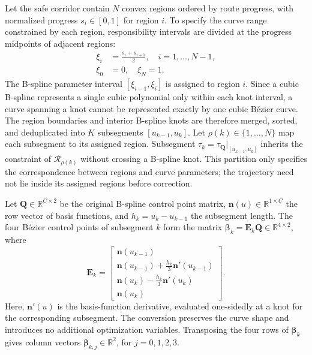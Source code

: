 \documentclass[journal]{IEEEtran}
\begin{document}
Let the safe corridor contain $N$ convex regions ordered by route progress,
with normalized progress $s_i\in[0,1]$ for region $i$. To specify the curve
range constrained by each region, responsibility intervals are divided at
the progress midpoints of adjacent regions:
\begin{equation}
\begin{aligned}
\xi_i&=\frac{s_i+s_{i+1}}{2},\quad i=1,\ldots,N-1,\\
\xi_0&=0,\quad \xi_N=1.
\end{aligned}
\end{equation}
The B-spline parameter interval $[\xi_{i-1},\xi_i]$ is assigned to region $i$.
Since a cubic B-spline represents a single cubic polynomial only within each
knot interval, a curve spanning a knot cannot be represented exactly by one
cubic B\'ezier curve. The region boundaries and interior B-spline knots are
therefore merged, sorted, and deduplicated into $K$ subsegments
$[u_{k-1},u_k]$. Let $\rho(k)\in\{1,\ldots,N\}$ map each subsegment to its
assigned region. Subsegment $\tau_k=\tau_{\mathbf Q}|_{[u_{k-1},u_k]}$ inherits
the constraint of $\mathcal R_{\rho(k)}$ without crossing a B-spline knot.
This partition only specifies the correspondence between regions and curve
parameters; the trajectory need not lie inside its assigned regions before
correction.

Let $\mathbf Q\in\mathbb R^{C\times2}$ be the original B-spline control point
matrix, $\mathbf n(u)\in\mathbb R^{1\times C}$ the row vector of basis
functions, and $h_k=u_k-u_{k-1}$ the subsegment length. The four B\'ezier
control points of subsegment $k$ form the matrix
$\boldsymbol\beta_k=\mathbf E_k\mathbf Q\in\mathbb R^{4\times2}$, where
\begin{equation}
\mathbf E_k=\begin{bmatrix}
\mathbf n(u_{k-1})\\[2pt]
\mathbf n(u_{k-1})+\tfrac{h_k}{3}\mathbf n'(u_{k-1})\\[3pt]
\mathbf n(u_k)-\tfrac{h_k}{3}\mathbf n'(u_k)\\[3pt]
\mathbf n(u_k)
\end{bmatrix}.
\end{equation}
Here, $\mathbf n'(u)$ is the basis-function derivative, evaluated one-sidedly
at a knot for the corresponding subsegment. The conversion preserves the curve
shape and introduces no additional optimization variables. Transposing the
four rows of $\boldsymbol\beta_k$ gives column vectors
$\boldsymbol\beta_{k,j}\in\mathbb R^2$, for $j=0,1,2,3$.
\end{document}
